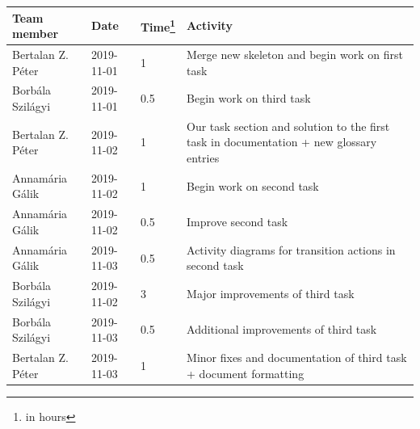 \documentclass[a4paper]{article}
\begin{document}
\begin{tabularx}{\textwidth}{l l l X}
	\toprule
	Team member & Date & Time\footnote{in hours} & Activity \\ \midrule

	Bertalan Z. Péter & 2019-11-01 & 1   & Merge new skeleton and begin work
	                                       on first task \\
	Borbála Szilágyi  & 2019-11-01 & 0.5 & Begin work on third task \\
	Bertalan Z. Péter & 2019-11-02 & 1   & Our task section and solution to
	                                       the first task in documentation +
	                                       new glossary entries \\
	Annamária Gálik   & 2019-11-02 & 1   & Begin work on second task \\
	Annamária Gálik   & 2019-11-02 & 0.5 & Improve second task \\
	Annamária Gálik   & 2019-11-03 & 0.5 & Activity diagrams for transition
	                                       actions in second task \\
	Borbála Szilágyi  & 2019-11-02 & 3   & Major improvements of third task
	                                       \\
	Borbála Szilágyi  & 2019-11-03 & 0.5 & Additional improvements of third
	                                       task \\
	Bertalan Z. Péter & 2019-11-03 & 1   & Minor fixes and documentation of
	                                       third task + document formatting
	                                       \\
	\bottomrule
\end{tabularx}

\clearpage
\glsaddall
\printglossaries
\end{document}
